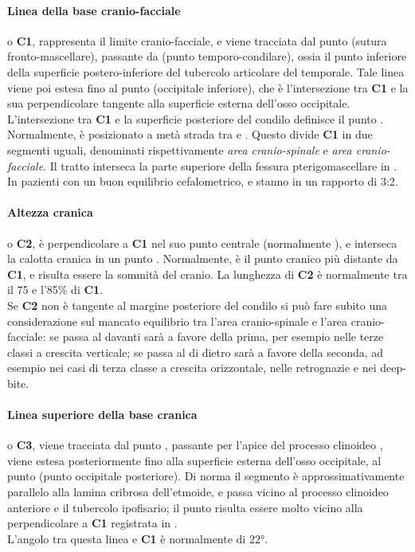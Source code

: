 \paragraph{Linea della base cranio-facciale} o \textbf{C1}, rappresenta il limite cranio-facciale, e viene tracciata dal punto  (sutura fronto-mascellare), passante da  (punto temporo-condilare), ossia il punto inferiore della superficie postero-inferiore del tubercolo articolare del temporale. Tale linea viene poi estesa fino al punto  (occipitale inferiore), che è l'intersezione tra \textbf{C1} e la sua perpendicolare tangente alla superficie esterna dell'osso occipitale.\\
L'intersezione tra \textbf{C1} e la superficie posteriore del condilo definisce il punto . Normalmente,  è posizionato a metà strada tra  e . Questo divide \textbf{C1} in due segmenti uguali, denominati rispettivamente \emph{area cranio-spinale} e \emph{area cranio-facciale}. Il tratto  interseca la parte superiore della fessura pterigomascellare in . In pazienti con un buon equilibrio cefalometrico,  e  stanno in un rapporto di 3:2.

\paragraph{Altezza cranica} o \textbf{C2}, è perpendicolare a \textbf{C1} nel suo punto centrale (normalmente ), e interseca la calotta cranica in un punto . Normalmente,  è il punto cranico più distante da \textbf{C1}, e  risulta essere la sommità del cranio. La lunghezza di \textbf{C2} è normalmente tra il 75 e l'85\% di \textbf{C1}.\\
Se \textbf{C2} non è tangente al margine posteriore del condilo si può fare subito una considerazione sul mancato equilibrio tra l'area cranio-spinale e l'area cranio-facciale: se passa al davanti sarà a favore della prima, per esempio nelle terze classi a crescita verticale; se passa al di dietro sarà a favore della seconda, ad esempio nei casi di terza classe a crescita orizzontale, nelle retrognazie e nei deep-bite.

\paragraph{Linea superiore della base cranica} o \textbf{C3}, viene tracciata dal punto , passante per l'apice del processo clinoideo , viene estesa posteriormente fino alla superficie esterna dell'osso occipitale, al punto  (punto occipitale posteriore). Di norma il segmento  è approssimativamente parallelo alla lamina cribrosa dell'etmoide, e passa vicino al processo clinoideo anteriore e il tubercolo ipofisario; il punto  risulta essere molto vicino alla perpendicolare a \textbf{C1} registrata in .\\
L'angolo tra questa linea e \textbf{C1} è normalmente di 22°.

